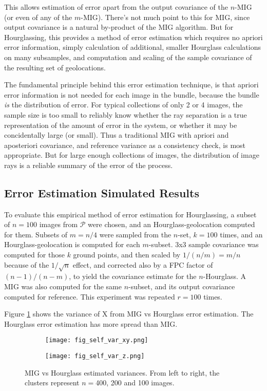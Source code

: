\documentclass[10pt]{amsart}
\newcommand{\Pimg}{\mathcal{P}}
\begin{document}
This allows estimation of error apart from the output covariance of the $n$-MIG
(or even of any of the $m$-MIG). There's not much point to this for MIG, since
output covariance is a natural by-product of the MIG algorithm. But for
Hourglassing, this provides a method of error estimation which requires no
apriori error information, simply calculation of additional, smaller Hourglass
calculations on many subsamples, and computation and scaling of the sample
covariance of the resulting set of geolocations.

The fundamental principle behind this error estimation technique, is that
apriori error information is not needed for each image in the bundle, because
the bundle {\em is} the distribution of error. For typical collections of only 2
or 4 images, the sample size is too small to reliably know whether the ray
separation is a true representation of the amount of error in the system, or
whether it may be concidentally large (or small). Thus a traditional MIG with
apriori and aposteriori covariance, and reference variance as a consistency
check, is most appropriate. But for large enough collections of images, the
distribution of image rays is a reliable summary of the error of the process.

\subsection{\label{hsimulation}Error Estimation Simulated Results}
To evaluate this empirical method of error estimation for Hourglassing, a subset
of $n=100$ images from $\Pimg$ were chosen, and an Hourglass-geolocation
computed for them. Subsets of $m=n/4$ were sampled from the $n$-set, $k=100$
times, and an Hourglass-geolocation is computed for each $m$-subset. 3x3 sample
covariance was computed for those $k$ ground points, and then scaled by
$1/(n/m)=m/n$ because of the $1/\sqrt{n}$ effect, and corrected also by a FPC
factor of $(n-1)/(n-m)$, to yield the covariance estimate for the
$n$-Hourglass. A MIG was also computed for the same $n$-subset, and its output
covariance computed for reference. This experiment was repeated $r=100$ times.

Figure \ref{fig:mig_vs_hourglass_var} shows the variance of X from MIG vs
Hourglass error estimation. The Hourglass error estimation has more spread than MIG.

\begin{figure}
\centering
\begin{subfigure}{.5\textwidth}
  \centering
  \texttt{[image: fig\_self\_var\_xy.png]}
\end{subfigure}%
\begin{subfigure}{.5\textwidth}
  \centering
  \texttt{[image: fig\_self\_var\_z.png]}
\end{subfigure}
\caption{\label{fig:mig_vs_hourglass_var}MIG vs Hourglass estimated
  variances. From left to right, the clusters represent $n=$400, 200 and 100
  images.}
\end{figure}
\end{document}
